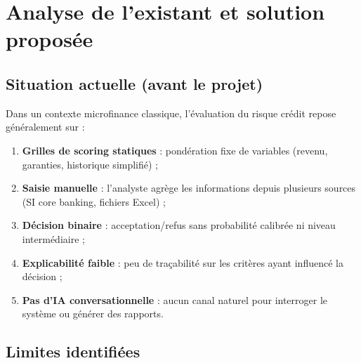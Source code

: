 \chapter{Analyse de l'existant et solution proposée}
\label{ch:existant}

\section{Situation actuelle (avant le projet)}

Dans un contexte microfinance classique, l'évaluation du risque crédit repose généralement sur :

\begin{enumerate}[leftmargin=*]
  \item \textbf{Grilles de scoring statiques} : pondération fixe de variables (revenu, garanties, historique simplifié) ;
  \item \textbf{Saisie manuelle} : l'analyste agrège les informations depuis plusieurs sources (SI core banking, fichiers Excel) ;
  \item \textbf{Décision binaire} : acceptation/refus sans probabilité calibrée ni niveau intermédiaire ;
  \item \textbf{Explicabilité faible} : peu de traçabilité sur les critères ayant influencé la décision ;
  \item \textbf{Pas d'IA conversationnelle} : aucun canal naturel pour interroger le système ou générer des rapports.
\end{enumerate}

\section{Limites identifiées}

